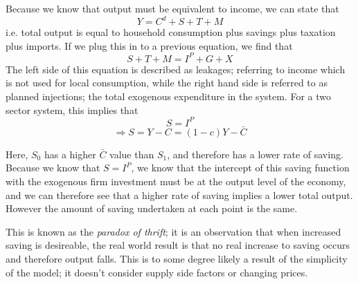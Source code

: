 \documentclass[12pt]{report}
\begin{document}
\begin{flushleft}
Because we know that output must be equivalent to income, we can state that
\[Y = C^d + S + T + M\]
i.e. total output is equal to household consumption plus savings plus taxation
plus imports. If we plug this in to a previous equation, we find that
\[S + T + M = I^P + G + X\]
The left side of this equation is described as leakages; referring to income
which is not used for local consumption, while the right hand side is referred
to as planned injections; the total exogenous expenditure in the system. For a
two sector system, this implies that
\[S = I^P\]
\[\Rightarrow S = Y - C  = (1 - c)Y - \bar{C}\]

\begin{center}
\end{center}

Here, \(S_0\) has a higher \(\bar{C}\) value than \(S_1\), and therefore has a
lower rate of saving. Because we know that \(S = I^P\), we know that the 
intercept of this saving function with the exogenous firm investment must be at
the output level of the economy, and we can therefore see that a higher rate of
saving implies a lower total output. However the amount of saving undertaken at
each point is the same. \par
This is known as the \textit{paradox of thrift}; it is
an observation that when increased saving is desireable, the real world result
is that no real increase to saving occurs and therefore output falls. This is
to some degree likely a result of the simplicity of the model; it doesn't 
consider supply side factors or changing prices.


\end{flushleft}
\end{document}
